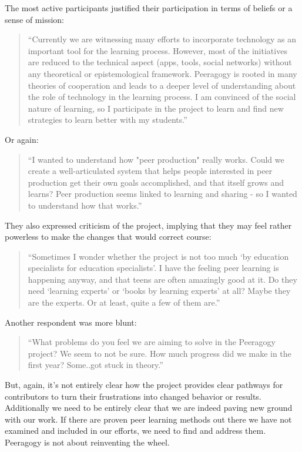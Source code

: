 \documentclass{acm_proc_article-sp}
\begin{document}
The most active participants justified their participation in terms of
beliefs or a sense of mission:

\begin{quote}
``Currently we are witnessing many efforts to incorporate technology as
an important tool for the learning process. However, most of the
initiatives are reduced to the technical aspect (apps, tools, social
networks) without any theoretical or epistemological
framework. Peeragogy is rooted in many theories of cooperation and
leads to a deeper level of understanding about the role of technology
in the learning process. I am convinced of the social nature of
learning, so I participate in the project to learn and find new
strategies to learn better with my students.''
\end{quote}

Or again:

\begin{quote}
``I wanted to understand how "peer production" really works. Could we
create a well-articulated system that helps people interested in peer
production get their own goals accomplished, and that itself grows and
learns? Peer production seems linked to learning and sharing - so I
wanted to understand how that works.''
\end{quote}

They also expressed criticism of the project, implying that they may feel rather powerless to make the changes that would correct course:

\begin{quote}
``Sometimes I wonder whether the project is not too much `by education specialists for education specialists'. I have the feeling peer learning is happening anyway, and that teens are often amazingly good at it. Do they need `learning experts' or `books by learning experts' at all? Maybe they are the experts. Or at least, quite a few of them are.''
\end{quote}

Another respondent was more blunt:

\begin{quote}
``What problems do you feel we are aiming to solve in the Peeragogy
project? We seem to not be sure. How much progress did we make in the
first year? Some..got stuck in theory.''
\end{quote}

But, again, it's not entirely clear how the project provides clear pathways for contributors to turn their frustrations into changed behavior or results. Additionally we need to be entirely clear that we are indeed paving new ground with our work. If there are proven peer learning methods out there we have not examined and included in our efforts, we need to find and address them. Peeragogy is not about reinventing the wheel.
\end{document}
